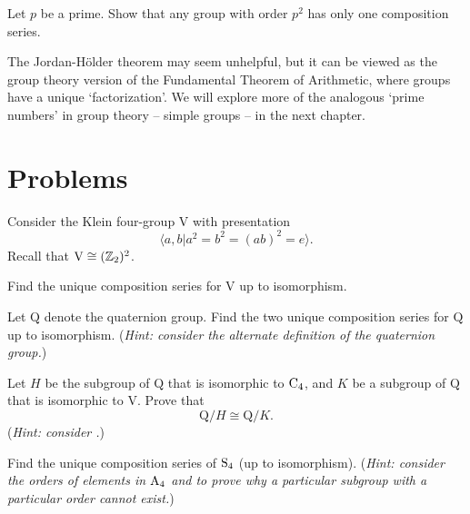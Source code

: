 \begin{exercise}
    Let $p$ be a prime. Show that any group with order $p^2$ has only one composition series.
\end{exercise}

The Jordan-H\"older theorem may seem unhelpful, but it can be viewed as the group theory version of the Fundamental Theorem of Arithmetic, where groups have a unique `factorization'. We will explore more of the analogous `prime numbers' in group theory -- simple groups -- in the next chapter.

\newpage

\section{Problems}
\begin{problem}
    Consider the Klein four-group $\mathrm{V}$ with presentation
    \[
        \langle a, b \vert a^2 = b^2 = (ab)^2 = e \rangle.
    \]
    Recall that $\mathrm{V} \cong (\mathbb{Z}_2)^2$.
    \begin{partquestions}{\roman*}
        \item Find the unique composition series for $\mathrm{V}$ up to isomorphism.
        \item Let $\mathrm{Q}$ denote the quaternion group. Find the two unique composition series for $\mathrm{Q}$ up to isomorphism.\newline
        (\textit{Hint: consider the alternate definition of the quaternion group.})
        \item Let $H$ be the subgroup of $\mathrm{Q}$ that is isomorphic to $\mathrm{C}_{4}$, and $K$ be a subgroup of $\mathrm{Q}$ that is isomorphic to $\mathrm{V}$. Prove that
        \[
            \mathrm{Q}/H \cong \mathrm{Q}/K.
        \]
        (\textit{Hint: consider .})
    \end{partquestions}
\end{problem}

\begin{problem}\label{problem-S4-composition-series}
    Find the unique composition series of $\mathrm{S}_{4}$ (up to isomorphism).\newline
    (\textit{Hint: consider the orders of elements in $\mathrm{A}_{4}$ and  to prove why a particular subgroup with a particular order cannot exist.})
\end{problem}

